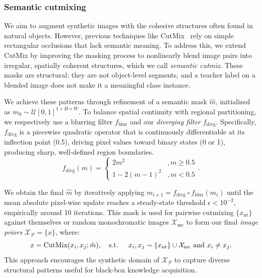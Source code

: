 \subsubsection{Semantic cutmixing} \label{sec:43-research02-framework-synthesis-semcutmix}
\begin{foldable} %
  We aim to augment synthetic images with the cohesive structures often found in natural objects.
  However, previous techniques like CutMix~\cite{yun2019cutmix} rely on simple rectangular occlusions that lack semantic meaning.
  To address this, we extend CutMix by improving the masking process to nonlinearly blend image pairs into irregular, spatially coherent structures, which we call \textit{semantic cutmix}. These masks are structural: they are not object-level segments, and a teacher label on a blended image does not make it a meaningful class instance.
\end{foldable}

\begin{foldable} %
  We achieve these patterns through refinement of a semantic mask $\hat{m}$, initialized as $m_{0} \sim \mathcal{U}[0,1]^{1 \times H \times W}$.
  To balance spatial continuity with regional partitioning, we respectively use a blurring filter $f_\text{blur}$ and our \textit{diverging filter} $f_\text{divg}$.
  Specifically, $f_\text{divg}$ is a piecewise quadratic operator that is continuously differentiable at its inflection point (0.5), driving pixel values toward binary states (0 or 1), producing sharp, well-defined region boundaries.
  \begin{equation} \label{eq:synthesis-diverging-filter}
    f_\text{divg}(m) =
    \begin{cases}
      2 m^2           & , m \ge 0.5 \\
      1 - 2 (m - 1)^2 & , m < 0.5
    \end{cases}.
  \end{equation}
\end{foldable}

\begin{foldable} %
  We obtain the final $\hat{m}$ by iteratively applying $m_{i+1} = f_\text{divg} \circ f_\text{blur}(m_i)$ until the mean absolute pixel-wise update reaches a steady-state threshold $\epsilon < 10^{-2}$, empirically around 10 iterations.
  This mask is used for pairwise cutmixing $\{x_\text{nt}\}$ against themselves or random monochromatic images $\mathcal{X}_\text{mc}$ to form our final \textit{image priors} $\mathcal{X}_\mathcal{P} = \{x\}$, where:
  \begin{equation} \label{eq:synthesis-semcutmix}
    x= \text{CutMix}(x_i, x_j; \hat{m}), \text{\quad s.t. \quad} x_i,x_j \sim \{x_\text{nt}\} \cup \mathcal{X}_\text{mc} \text{ and } x_i \ne x_j.
  \end{equation}
  This approach encourages the synthetic domain of $\mathcal{X}_\mathcal{P}$ to capture diverse structural patterns useful for black-box knowledge acquisition.
\end{foldable}

